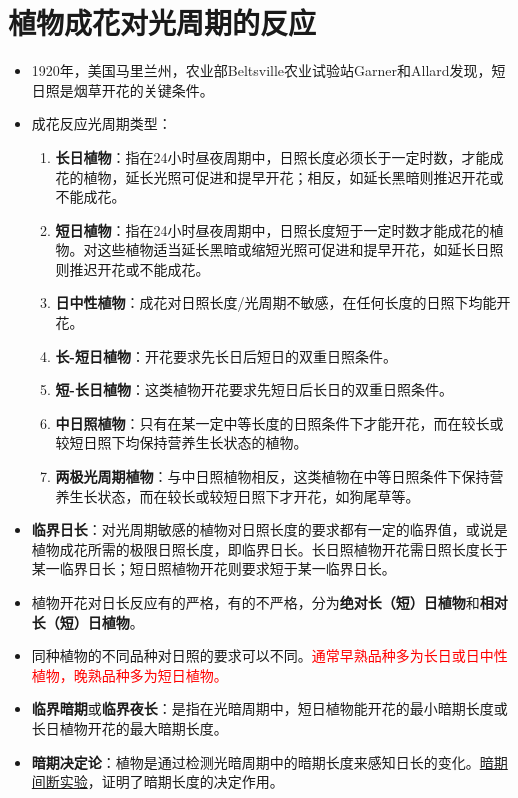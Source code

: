 \section{植物成花对光周期的反应}
\begin{itemize}
    \item 1920年，美国马里兰州，农业部Beltsville农业试验站Garner和Allard发现，短日照是烟草开花的关键条件。
    \item 成花反应光周期类型：
    \begin{enumerate}
        \item \textbf{长日植物}：指在24小时昼夜周期中，日照长度必须长于一定时数，才能成花的植物，延长光照可促进和提早开花；相反，如延长黑暗则推迟开花或不能成花。
        \item \textbf{短日植物}：指在24小时昼夜周期中，日照长度短于一定时数才能成花的植物。对这些植物适当延长黑暗或缩短光照可促进和提早开花，如延长日照则推迟开花或不能成花。
        \item \textbf{日中性植物}：成花对日照长度/光周期不敏感，在任何长度的日照下均能开花。
        \item \textbf{长-短日植物}：开花要求先长日后短日的双重日照条件。
        \item \textbf{短-长日植物}：这类植物开花要求先短日后长日的双重日照条件。     
        \item \textbf{中日照植物}：只有在某一定中等长度的日照条件下才能开花，而在较长或较短日照下均保持营养生长状态的植物。
        \item \textbf{两极光周期植物}：与中日照植物相反，这类植物在中等日照条件下保持营养生长状态，而在较长或较短日照下才开花，如狗尾草等。
    \end{enumerate}
    \item \textbf{临界日长}：对光周期敏感的植物对日照长度的要求都有一定的临界值，或说是植物成花所需的极限日照长度，即临界日长。长日照植物开花需日照长度长于某一临界日长；短日照植物开花则要求短于某一临界日长。
    \item 植物开花对日长反应有的严格，有的不严格，分为\textbf{绝对长（短）日植物}和\textbf{相对长（短）日植物}。
    \item 同种植物的不同品种对日照的要求可以不同。\textcolor{red}{通常早熟品种多为长日或日中性植物，晚熟品种多为短日植物。}
    \item \textbf{临界暗期}或\textbf{临界夜长}：是指在光暗周期中，短日植物能开花的最小暗期长度或长日植物开花的最大暗期长度。
    \item \textbf{暗期决定论}：植物是通过检测光暗周期中的暗期长度来感知日长的变化。\uline{暗期间断实验}，证明了暗期长度的决定作用。 
\end{itemize}

